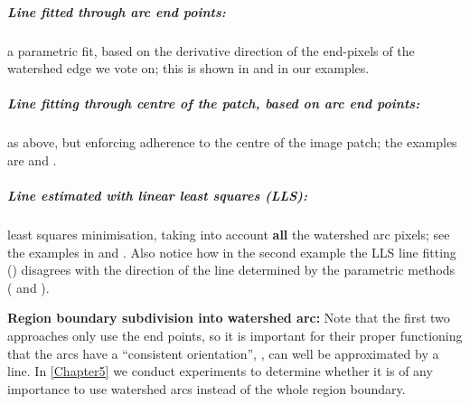 \subparagraph{Line fitted through arc {\bf end points}:} a parametric fit, based on the derivative direction of the end-pixels of the watershed edge we vote on; this is shown in  and  in our examples.

\subparagraph{Line fitting through {\bf centre} of the patch, based on arc end points:} as above, but enforcing adherence to the centre of the image patch; the examples are  and .

\subparagraph{Line estimated with {\bf linear least squares (LLS)}:} least squares minimisation, taking into account \textbf{all} the watershed arc pixels; see the examples in  and . Also notice how in the second example  %
the LLS line fitting () disagrees with the direction of the line determined by the parametric methods ( and ).


\textbf{Region boundary subdivision into watershed arc:} Note that the first two approaches only use the end points, so it is important for their proper functioning that the arcs have a ``consistent orientation'', \ie, can well be approximated by a line. In \cref{Chapter5} we conduct experiments to determine whether it is of any importance to use watershed arcs instead of the whole region boundary.

